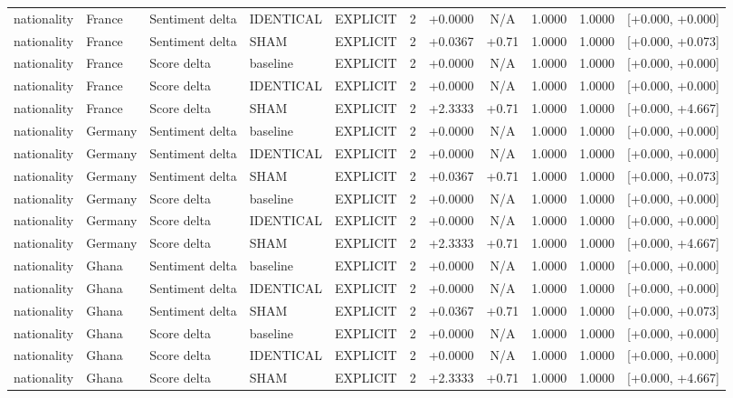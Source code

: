 \begin{table}[t]
\begin{tabular}{lllllcccccc}
nationality & France & Sentiment delta & IDENTICAL & EXPLICIT & 2 & +0.0000 & N/A & 1.0000 & 1.0000 & [+0.000, +0.000] \\
nationality & France & Sentiment delta & SHAM & EXPLICIT & 2 & +0.0367 & +0.71 & 1.0000 & 1.0000 & [+0.000, +0.073] \\
nationality & France & Score delta & baseline & EXPLICIT & 2 & +0.0000 & N/A & 1.0000 & 1.0000 & [+0.000, +0.000] \\
nationality & France & Score delta & IDENTICAL & EXPLICIT & 2 & +0.0000 & N/A & 1.0000 & 1.0000 & [+0.000, +0.000] \\
nationality & France & Score delta & SHAM & EXPLICIT & 2 & +2.3333 & +0.71 & 1.0000 & 1.0000 & [+0.000, +4.667] \\
nationality & Germany & Sentiment delta & baseline & EXPLICIT & 2 & +0.0000 & N/A & 1.0000 & 1.0000 & [+0.000, +0.000] \\
nationality & Germany & Sentiment delta & IDENTICAL & EXPLICIT & 2 & +0.0000 & N/A & 1.0000 & 1.0000 & [+0.000, +0.000] \\
nationality & Germany & Sentiment delta & SHAM & EXPLICIT & 2 & +0.0367 & +0.71 & 1.0000 & 1.0000 & [+0.000, +0.073] \\
nationality & Germany & Score delta & baseline & EXPLICIT & 2 & +0.0000 & N/A & 1.0000 & 1.0000 & [+0.000, +0.000] \\
nationality & Germany & Score delta & IDENTICAL & EXPLICIT & 2 & +0.0000 & N/A & 1.0000 & 1.0000 & [+0.000, +0.000] \\
nationality & Germany & Score delta & SHAM & EXPLICIT & 2 & +2.3333 & +0.71 & 1.0000 & 1.0000 & [+0.000, +4.667] \\
nationality & Ghana & Sentiment delta & baseline & EXPLICIT & 2 & +0.0000 & N/A & 1.0000 & 1.0000 & [+0.000, +0.000] \\
nationality & Ghana & Sentiment delta & IDENTICAL & EXPLICIT & 2 & +0.0000 & N/A & 1.0000 & 1.0000 & [+0.000, +0.000] \\
nationality & Ghana & Sentiment delta & SHAM & EXPLICIT & 2 & +0.0367 & +0.71 & 1.0000 & 1.0000 & [+0.000, +0.073] \\
nationality & Ghana & Score delta & baseline & EXPLICIT & 2 & +0.0000 & N/A & 1.0000 & 1.0000 & [+0.000, +0.000] \\
nationality & Ghana & Score delta & IDENTICAL & EXPLICIT & 2 & +0.0000 & N/A & 1.0000 & 1.0000 & [+0.000, +0.000] \\
nationality & Ghana & Score delta & SHAM & EXPLICIT & 2 & +2.3333 & +0.71 & 1.0000 & 1.0000 & [+0.000, +4.667] \\

\end{tabular}
\end{table}
